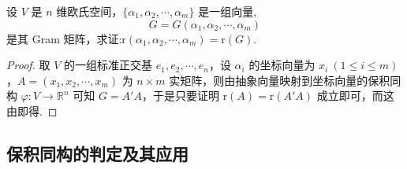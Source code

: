 \documentclass[../../main.tex]{subfiles}%
\begin{document}
\begin{proposition}\label{proposition:Gram阵的秩与其生成向量的秩相同-例9.33}
设 \(V\) 是 \(n\) 维欧氏空间，\(\{\alpha_1,\alpha_2,\cdots,\alpha_m\}\) 是一组向量,$$G = G(\alpha_1,\alpha_2,\cdots,\alpha_m)$$ 是其 Gram 矩阵，求证:$\mathrm{r}(\alpha_1,\alpha_2,\cdots,\alpha_m)=\mathrm{r}(G).$
\end{proposition}
\begin{proof}

取 \(V\) 的一组标准正交基 \(e_1,e_2,\cdots,e_n\)，设 \(\alpha_i\) 的坐标向量为 \(x_i\ (1\leqslant  i\leqslant  m)\)，\(A=(x_1,x_2,\cdots,x_m)\) 为 \(n\times m\) 实矩阵，则由抽象向量映射到坐标向量的保积同构 \(\varphi:V\rightarrow\mathbb{R}^n\) 可知 \(G = A'A\)，于是只要证明 \(\mathrm{r}(A)=\mathrm{r}(A'A)\) 成立即可，而这由即得.

\end{proof}


\subsection{保积同构的判定及其应用}
\end{document}
